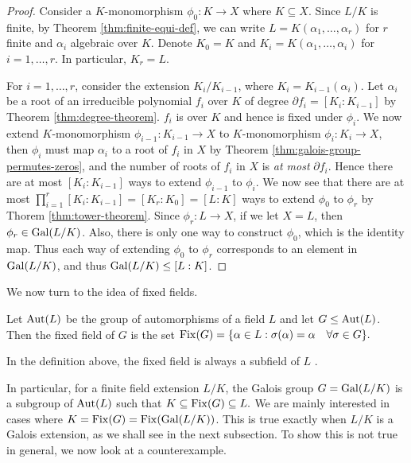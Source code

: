 \begin{proof}
	Consider a $K$-monomorphism $\phi_0 : K \to X$ where $K \subseteq X$. Since $L/K$ is finite, by Theorem \ref{thm:finite-equi-def}, we can write $L = K(\alpha_1, \ldots, \alpha_r)$ for $r$ finite and $\alpha_i$ algebraic over $K$. Denote $K_0 = K$ and
	$K_i = K(\alpha_1, \dots, \alpha_i)$ for $i = 1, \ldots, r$. In particular, $K_r = L$. 
	
	
	For $i = 1, \ldots, r$, consider the extension $K_i / K_{i-1}$, where $K_i = K_{i-1} (\alpha_i)$. Let $\alpha_i$ be a root of an irreducible polynomial $f_i$ over $K$ of degree $\partial f_i = [K_i : K_{i-1}]$ by Theorem \ref{thm:degree-theorem}. $f_i$ is over $K$ and hence is fixed under $\phi_i$. We now extend $K$-monomorphism $\phi_{i-1} : K_{i-1} \to X$ to $K$-monomorphism $\phi_i: K_i \to X$, then $\phi_i$ must map $\alpha_i$ to a root of $f_i$ in $X$ by Theorem \ref{thm:galois-group-permutes-zeros}, and the number of roots of $f_i$ in $X$ is \textit{at most} $\partial f_i$. Hence there are at most $[K_i : K_{i-1}]$ ways to extend $\phi_{i-1}$ to $\phi_i$. We now see that there are at most $\prod_{i=1} ^r [K_i : K_{i-1}] = [K_r : K_0] = [L : K]$ ways to extend $\phi_0$ to $\phi_r$ by Thorem \ref{thm:tower-theorem}. Since $\phi_r : L \to X$, if we let $X = L$, then $\phi_r \in \operatorname{Gal}(L/K)$. Also, there is only one way to construct $\phi_0$, which is the identity map. Thus each way of extending $\phi_0$ to $\phi_r$ corresponds to an element in $\operatorname{Gal}(L/K)$, and thus $\operatorname{Gal}(L/K) \le [L:K]$. 
\end{proof}



We now turn to the idea of fixed fields.
\begin{definition}
    Let $\operatorname{Aut}(L)$ be the group of automorphisms of a field $L$ and let $G \leq \operatorname{Aut}(L)$. Then the fixed field of $G$ is the set $\operatorname{Fix}(G) = \{ \alpha \in L : \sigma(\alpha) = \alpha \quad \forall \sigma \in G \}. $
\end{definition}

In the definition above, the fixed field is always a subfield of $L$ \cite[p.~18]{morandi_field_1996}. 

In particular, for a finite field extension $L/ K$, the Galois group $G = \operatorname{Gal}(L / K)$ is a subgroup of $\operatorname{Aut}(L)$ such that $K \subseteq \operatorname{Fix}(G) \subseteq L. $ We are mainly interested in cases where $K = \operatorname{Fix}(G) = \operatorname{Fix}(\operatorname{Gal}(L/K))$. This is true exactly when $L/K$ is a Galois extension, as we shall see in the next subsection. To show this is not true in general, we now look at a counterexample. 

